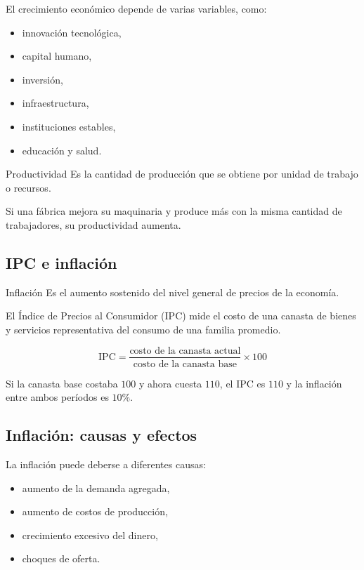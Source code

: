 El crecimiento económico depende de varias variables, como:
\begin{itemize}
    \item innovación tecnológica,
    \item capital humano,
    \item inversión,
    \item infraestructura,
    \item instituciones estables,
    \item educación y salud.
\end{itemize}

\begin{concepto}{Productividad}
Es la cantidad de producción que se obtiene por unidad de trabajo o recursos.
\end{concepto}

\begin{ejemplo}
Si una fábrica mejora su maquinaria y produce más con la misma cantidad de trabajadores, su productividad aumenta.
\end{ejemplo}

\subsection{IPC e inflación}

\begin{concepto}{Inflación}
Es el aumento sostenido del nivel general de precios de la economía.
\end{concepto}

El Índice de Precios al Consumidor (IPC) mide el costo de una canasta de bienes y servicios representativa del consumo de una familia promedio.

\begin{equation}
\text{IPC} = \frac{\text{costo de la canasta actual}}{\text{costo de la canasta base}} \times 100
\end{equation}

\begin{ejemplo}
Si la canasta base costaba $100$ y ahora cuesta $110$, el IPC es $110$ y la inflación entre ambos períodos es $10\%$.
\end{ejemplo}

\subsection{Inflación: causas y efectos}

La inflación puede deberse a diferentes causas:
\begin{itemize}
    \item aumento de la demanda agregada,
    \item aumento de costos de producción,
    \item crecimiento excesivo del dinero,
    \item choques de oferta.
\end{itemize}

